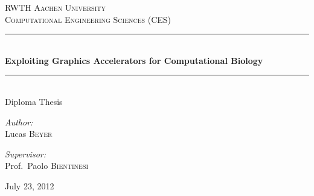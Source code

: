 
\begin{titlepage}

\begin{center}

\textsc{\LARGE RWTH Aachen University}\\[1.5cm]


\textsc{\Large Computational Engineering Sciences (CES)}\\[0.5cm]

{\rule{\linewidth}{0.5mm}} \\[0.4cm]
{\huge \bfseries Exploiting Graphics Accelerators for Computational Biology}\\[0.4cm]

{\rule{\linewidth}{0.5mm}}
\\[0.4cm]
{\Large Diploma Thesis}\\[1.5cm]

\begin{minipage}{0.4\textwidth}
\begin{flushleft} \large
\emph{Author:}\\
Lucas \textsc{Beyer}
\end{flushleft}
\end{minipage}
\begin{minipage}{0.4\textwidth}
\begin{flushright} \large
\emph{Supervisor:} \\
Prof.~Paolo \textsc{Bientinesi}
\end{flushright}
\end{minipage}

\vfill

{\large July 23, 2012}

\end{center}

\end{titlepage}
